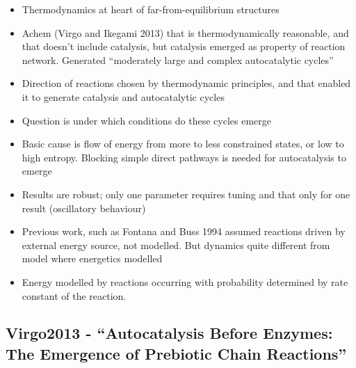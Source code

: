 		\begin{itemize}
			\item
			
			Thermodynamics at heart of far-from-equilibrium structures
			
			\item
			
			Achem (Virgo and Ikegami 2013) that is thermodynamically reasonable,
			and that doesn't include catalysis, but catalysis emerged as property
			of reaction network. Generated ``moderately large and complex
			autocatalytic cycles''
			
			\item
			
			Direction of reactions chosen by thermodynamic principles, and that
			enabled it to generate catalysis and autocatalytic cycles
			
			\item
			
			Question is under which conditions do these cycles emerge
			
			\item
			
			Basic cause is flow of energy from more to less constrained states, or
			low to high entropy. Blocking simple direct pathways is needed for
			autocatalysis to emerge
			
			\item
			
			Results are robust; only one parameter requires tuning and that only
			for one result (oscillatory behaviour)
			
			\item
			
			Previous work, such as Fontana and Buss 1994 assumed reactions driven
			by external energy source, not modelled. But dynamics quite different
			from model where energetics modelled
			
			\item
			
			Energy modelled by reactions occurring with probability determined by
			rate constant of the reaction.
			
		\end{itemize}
		
		\hypertarget{virgo2013---autocatalysis-before-enzymes-the-emergence-of-prebiotic-chain-reactions}{\subsection{Virgo2013
				- ``Autocatalysis Before Enzymes: The Emergence of Prebiotic Chain
				Reactions''}\label{virgo2013---autocatalysis-before-enzymes-the-emergence-of-prebiotic-chain-reactions}}
		
